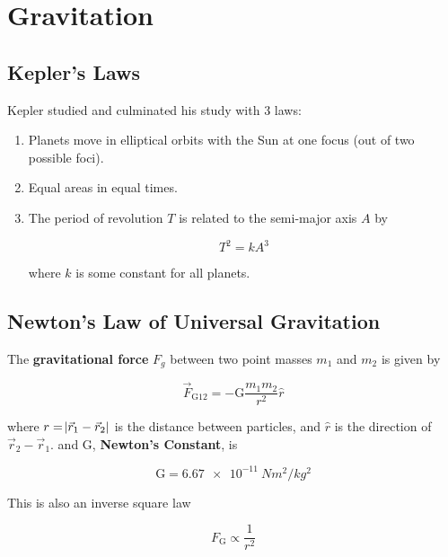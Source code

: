 \chapter{Gravitation}

\section{Kepler's Laws}

\begin{definition}
	Kepler studied and culminated his study with 3 laws:
	\begin{enumerate}
		\item Planets move in elliptical orbits with the Sun at one focus (out of two possible foci).
		\item Equal areas in equal times.
		\item The period of revolution $T$ is related to the semi-major axis $A$ by
		
		\begin{equation}
			T^2 = k A^3
		\end{equation}

		where $k$ is some constant for all planets.
	\end{enumerate}
\end{definition}

\section{Newton's Law of Universal Gravitation}

The \textbf{gravitational force} $F_g$ between two point masses $m_1$ and $m_2$ is given by

\begin{equation}
	\vec F_\mathrm{G12} = - \mathrm{G} \frac{m_1 m_2}{r^2} \hat r
\end{equation}

where $r = \abs{\vec r_1 - \vec r_2}$ is the distance between particles, and $\hat r$ is the direction of $\vec r_2 - \vec r_1$. and $\mathrm{G}$, \textbf{Newton's Constant}, is

\begin{equation}
	\mathrm{G} = \SI{6.67e-11}{N m^2 / kg^2}
\end{equation}

This is also an inverse square law

\begin{equation}
	F_\mathrm{G} \propto \frac{1}{r^2}
\end{equation}

